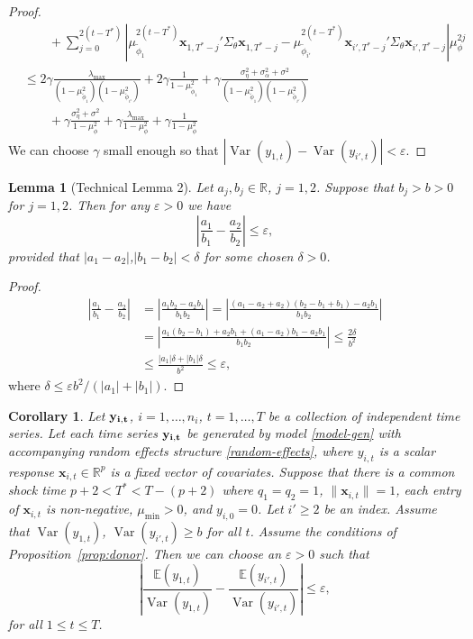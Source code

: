 \documentclass[11pt]{article}
\newcommand{\R}{\mathbb{R}}
\newcommand{\x}{\textbf{x}}
\def\E{\mathbb{E}} %
\DeclareMathOperator{\Var}{Var} %
\newtheorem{cor}{Corollary}
\newtheorem{lem}{Lemma}
\theoremstyle{definition}
\begin{document}
\begin{proof}
\begin{align*}
   &\qquad+ \sum_{j=0}^{2(t - T^*)}\left\vert \mu_{\tilde\phi_1}^{2(t - T^*)}\x_{1,T^*-j}'\Sigma_\theta\x_{1,T^*-j} - \mu_{\tilde\phi_{i'}}^{2(t - T^*)}\x_{i',T^*-j}'\Sigma_\theta\x_{i',T^*-j} \right\vert \mu_{\phi}^{2j} \\
   &\leq 2\gamma\frac{\lambda_{\max}}{(1 - \mu_{\tilde\phi_1}^{2})(1 - \mu_{\tilde\phi_{i'}}^{2})} + 2\gamma\frac{1}{1 - \mu_{\tilde\phi_1}^2} + \gamma\frac{\sigma^2_\eta + \sigma^2_{\alpha}+ \sigma^2}{(1 - \mu_{\tilde\phi_1}^{2})(1 - \mu_{\tilde\phi_{i'}}^{2})} \\ 
   &\qquad + \gamma\frac{\sigma^2_\eta + \sigma^2}{1 - \mu_\phi^2} + \gamma\frac{\lambda_{\max}}{1 - \mu_\phi^2} + \gamma\frac{1}{1 - \mu_\phi^2}
   \end{align*}
We can choose $\gamma$ small enough so that $|\Var(y_{1,t}) - \Var(y_{i',t})| < \varepsilon$.
\end{proof}

\begin{lem}[Technical Lemma 2] \label{lem:diffsig2noise}
Let $a_j, b_j \in \R$, $j = 1,2$. Suppose that $b_j > b > 0$ for $j = 1,2$. Then for any $\varepsilon > 0$ we have 
$$
  \left\vert\frac{a_1}{b_1} - \frac{a_2}{b_2}\right\vert \leq \varepsilon,
$$
provided that $|a_1-a_2|$,$|b_1-b_2| < \delta$ for some chosen $\delta > 0$.
\end{lem}

\begin{proof}
\begin{align*}
  \left\vert\frac{a_1}{b_1} - \frac{a_2}{b_2}\right\vert 
    &= \left\vert\frac{a_1b_2 - a_2b_1}{b_1b_2}\right\vert 
    = \left\vert\frac{(a_1 - a_2 + a_2)(b_2 - b_1 + b_1) - a_2b_1}{b_1b_2}\right\vert \\
    &= \left\vert \frac{a_1(b_2 - b_1) + a_2b_1 + (a_1 - a_2)b_1 - a_2b_1}{b_1b_2} \right\vert \leq \frac{2\delta}{b^2} \\
    &\leq \frac{|a_1|\delta + |b_1|\delta}{b^2} \leq \varepsilon, 
\end{align*}
where $\delta \leq \varepsilon b^2/(|a_1| + |b_1|)$.
\end{proof}

\begin{cor} \label{cor:differences}
  Let $\bf{y}_{i,t}$, $i = 1,\ldots,n_i$, $t = 1,\ldots, T$ be a collection of independent time series. Let each time series $\bf{y}_{i,t}$ be generated by model \eqref{model-gen} with accompanying random effects structure \eqref{random-effects}, where $y_{i,t}$ is a scalar response $\x_{i,t} \in \R^p$ is a fixed vector of covariates. Suppose that there is a common shock time $p + 2 < T^* < T - (p+2)$ where $q_1 = q_2 = 1$, $\|\x_{i,t}\| = 1$, each entry of $\x_{i,t}$ is non-negative, $\mu_{\min} > 0$, and $y_{i,0} = 0$. Let $i' \geq 2$ be an index. Assume that $\Var(y_{1,t})$, $\Var(y_{i',t}) \geq b$ for all $t$.  Assume the conditions of Proposition~\ref{prop:donor}. Then we can choose an $\varepsilon > 0$ such that 
  $$
    \left\vert \frac{\E(y_{1,t})}{\Var(y_{1,t})} - \frac{\E(y_{i',t})}{\Var(y_{i',t})} \right\vert \leq \varepsilon,
  $$
  for all $1 \leq t \leq T$.
\end{cor}
\end{document}
